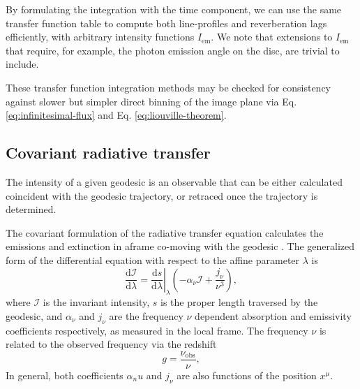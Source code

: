 \documentclass[fleqn,usenatbib]{mnras}
\renewcommand{\d}{\text{d}}
\begin{document}
By formulating the integration with the time component, we can use the same transfer function table to compute both line-profiles and reverberation lags efficiently, with arbitrary intensity functions $I_\text{em}$. We note that extensions to $I_\text{em}$ that require, for example, the photon emission angle on the disc, are trivial to include.

These transfer function integration methods may be checked for consistency against slower but simpler direct binning of the image plane via Eq. \eqref{eq:infinitesimal-flux} and Eq. \eqref{eq:liouville-theorem}.

\subsection{Covariant radiative transfer}

The intensity of a given geodesic is an observable that can be either calculated coincident with the geodesic trajectory, or retraced once the trajectory is determined.

The covariant formulation of the radiative transfer equation calculates the emissions and extinction in aframe co-moving with the geodesic \citep{fuerst_radiation_2004,younsi_general_2012}. The generalized form of the differential equation with respect to the affine parameter $\lambda$ is
\begin{equation}
    \label{eq:covariant-radiative-transfer}
    \frac{\d \mathcal{I}}{\d \lambda} = \left. \frac{\d s}{\d \lambda} \right\rvert_\lambda \left( -\alpha_\nu \mathcal{I} + \frac{j_\nu}{\nu^3} \right),
\end{equation}
where $\mathcal{I}$ is the invariant intensity, $s$ is the proper length traversed by the geodesic, and $\alpha_\nu$ and $j_\nu$ are the frequency $\nu$ dependent absorption and emissivity coefficients respectively, as measured in the local frame. The frequency $\nu$ is related to the observed frequency via the redshift
\begin{equation}
    g = \frac{\nu_\text{obs}}{\nu},
\end{equation}
In general, both coefficients $\alpha_nu$ and $j_\nu$ are also functions of the position $x^\mu$. 
\end{document}
